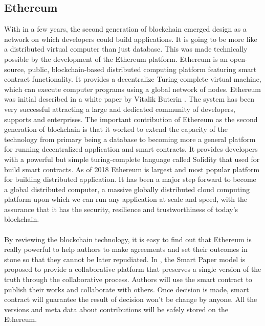 \documentclass[openany,12pt]{ecsthesis}      %
\begin{document}
\subsection{Ethereum}
With in a few years,
the second generation of blockchain emerged design as a network on which developers could build applications. 
It is going to be more like a distributed virtual computer than just database.
This was made technically possible by the development of the Ethereum platform. 
Ethereum is an open-source, public, blockchain-based distributed computing platform featuring smart contract functionality.
It provides a decentralize Turing-complete virtual machine, which can execute computer programs using a global network of nodes.
Ethereum was initial described in a white paper by Vitalik Buterin \cite{buterin2013ethereum}. 
The system has been very successful attracting a large and dedicated community of developers, supports and enterprises.
The important contribution of Ethereum as the second generation of blockchain is that 
it worked to extend the capacity of the technology from primary
being a database to becoming more a general platform for running decentralized application and smart contracts.
It provides developers with a powerful but simple turing-complete language called Solidity that used for build smart contracts.
As of 2018 Ethereum is largest and most popular platform for building distributed application. 
It has been a major step forward to become a global distributed computer, 
a massive globally distributed cloud computing platform upon which we can run any application at scale and speed,
with the assurance that it has the security, resilience and trustworthiness of today's blockchain.
\paragraph{}
By reviewing the blockchain technology, 
it is easy to find out that Ethereum is really powerful to
help authors to make agreements and set their outcomes in stone so that they cannot be later repudiated.
In \cite{Khoe:1994:CML:2288694.2294265}, 
the Smart Paper model is proposed to provide a collaborative platform 
that preserves a single version of the truth through the collaborative process. 
Authors will use the smart contract to publish their works and collaborate with others.
Once decision is made, smart contract will guarantee the result of decision won't be change by anyone.
All the versions and meta data about contributions will be safely stored on the Ethereum.
\end{document}
